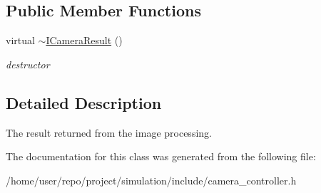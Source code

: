 \subsection*{Public Member Functions}
\begin{DoxyCompactItemize}
\item 
\mbox{\label{classICameraResult_a6c8f4f6c3748c00236bd588cf9410f8b}} 
virtual \hyperlink{classICameraResult_a6c8f4f6c3748c00236bd588cf9410f8b}{$\sim$\+I\+Camera\+Result} ()
\begin{DoxyCompactList}\small\item\em destructor \end{DoxyCompactList}\end{DoxyCompactItemize}


\subsection{Detailed Description}
The result returned from the image processing. 

The documentation for this class was generated from the following file\+:\begin{DoxyCompactItemize}
\item 
/home/user/repo/project/simulation/include/camera\+\_\+controller.\+h\end{DoxyCompactItemize}
